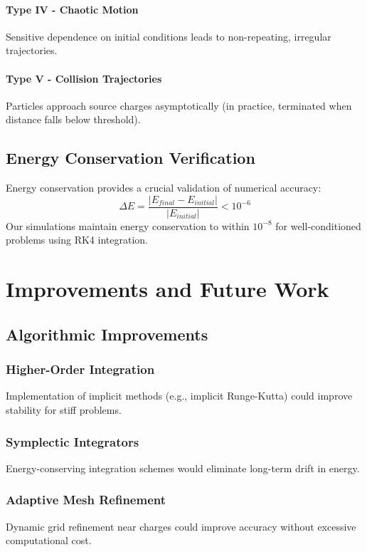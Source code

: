 \documentclass[12pt,a4paper]{article}
\begin{document}
\paragraph{Type IV - Chaotic Motion} 
Sensitive dependence on initial conditions leads to non-repeating, irregular trajectories. 

\paragraph{Type V - Collision Trajectories} 
Particles approach source charges asymptotically (in practice, terminated when distance falls below threshold). 

\subsection{Energy Conservation Verification} 
Energy conservation provides a crucial validation of numerical accuracy: 
\begin{equation} 
    \Delta E = \frac{|E_{final} - E_{initial}|}{|E_{initial}|} < 10^{-6} 
\end{equation} 
Our simulations maintain energy conservation to within $10^{-8}$ for well-conditioned problems using RK4 integration.

\section{Improvements and Future Work} 
\subsection{Algorithmic Improvements} 

\subsubsection{Higher-Order Integration} 
Implementation of implicit methods (e.g., implicit Runge-Kutta) could improve stability for stiff problems. 

\subsubsection{Symplectic Integrators} 
Energy-conserving integration schemes would eliminate long-term drift in energy. 

\subsubsection{Adaptive Mesh Refinement} 
Dynamic grid refinement near charges could improve accuracy without excessive computational cost. 
\end{document}
